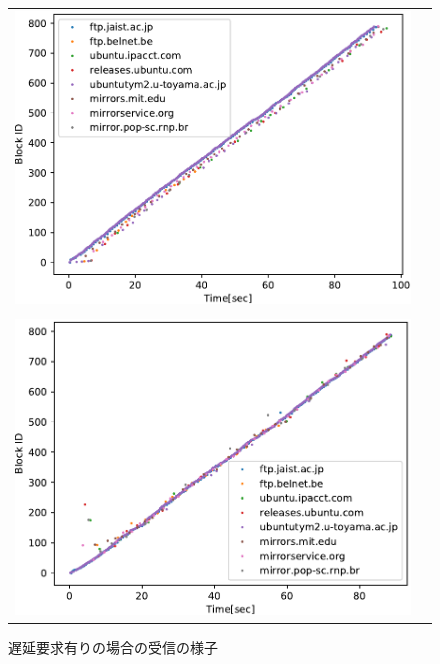 \documentclass[a4j,12pt]{gradthesis_utf8}
\begin{document}
\begin{figure}[ht]
	\begin{tabular}{cc}
		\begin{minipage}[t]{0.9\hsize}
			\centering
			\includegraphics[width=13cm]{figure/TypicalPlotDelay=NORMALInit=FalseDup=IBRC.pdf}
			\caption{遅延要求なしの場合の受信の様子}
			\label{tpdnpub}
		\end{minipage}\\ \\
		\begin{minipage}[t]{0.9\hsize}
			\centering
			\includegraphics[width=13cm]{figure/TypicalPlotDelay=DIFFInit=TrueDup=IBRC.pdf}
			\caption{遅延要求有りの場合の受信の様子}
			\label{tpddpub}
		\end{minipage}
	\end{tabular}
\end{figure}
\end{document}
